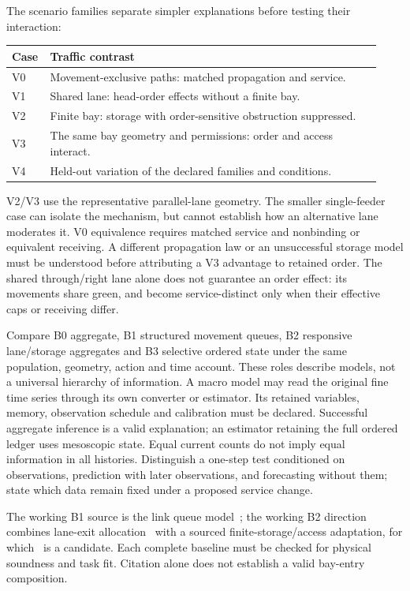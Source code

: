 \documentclass[10pt,a4paper]{article}
\begin{document}
The scenario families separate simpler explanations before testing their
interaction:
\begin{center}
\setlength{\tabcolsep}{5pt}
\begin{tabular}{@{}p{0.07\linewidth}p{0.86\linewidth}@{}}
\toprule
Case & Traffic contrast\\
\midrule
V0 & Movement-exclusive paths: matched propagation and service.\\
V1 & Shared lane: head-order effects without a finite bay.\\
V2 & Finite bay: storage with order-sensitive obstruction suppressed.\\
V3 & The same bay geometry and permissions: order and access interact.\\
V4 & Held-out variation of the declared families and conditions.\\
\bottomrule
\end{tabular}
\end{center}
V2/V3 use the representative parallel-lane geometry. The smaller
single-feeder case can isolate the mechanism, but cannot establish how
an alternative lane moderates it. V0 equivalence requires matched
service and nonbinding or equivalent receiving. A different propagation
law or an unsuccessful storage model must be understood before attributing
a V3 advantage to retained order. The shared through/right lane alone
does not guarantee an order effect: its movements share green, and
become service-distinct only when their effective caps or receiving differ.

Compare B0 aggregate, B1 structured movement queues, B2 responsive
lane/storage aggregates and B3 selective ordered state under the same
population, geometry, action and time account. These roles describe
models, not a universal hierarchy of information. A macro model may
read the original fine time series through its own converter or estimator.
Its retained variables, memory, observation schedule and calibration
must be declared. Successful aggregate inference is a valid explanation;
an estimator retaining the full ordered ledger uses mesoscopic state.
Equal current counts do not imply equal information in all histories.
Distinguish a one-step test conditioned on observations, prediction with
later observations, and forecasting without them; state which data remain
fixed under a proposed service change.

The working B1 source is the link queue model~\cite{wei}; the working
B2 direction combines lane-exit allocation~\cite{gong} with a sourced
finite-storage/access adaptation, for which~\cite{liu} is a candidate.
Each complete baseline must be checked for physical soundness and task
fit. Citation alone does not establish a valid bay-entry composition.
\end{document}
